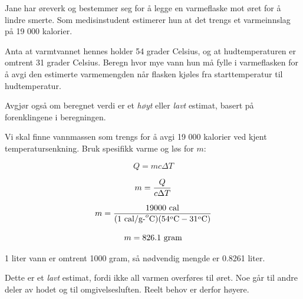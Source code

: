 

Jane har øreverk og bestemmer seg for å legge en varmeflaske mot øret for å lindre smerte. Som medisinstudent estimerer hun at det trengs et varmeinnslag på 19 000 kalorier.

\vskip 10pt

Anta at varmtvannet hennes holder 54 grader Celsius, og at hudtemperaturen er omtrent 31 grader Celsius. Beregn hvor mye vann hun må fylle i varmeflasken for å avgi den estimerte varmemengden når flasken kjøles fra starttemperatur til hudtemperatur.

\vskip 10pt

Avgjør også om beregnet verdi er et {\it høyt} eller {\it lavt} estimat, basert på forenklingene i beregningen.







Vi skal finne vannmassen som trengs for å avgi 19 000 kalorier ved kjent temperatursenkning. Bruk spesifikk varme og løs for $m$:

$$Q = mc \Delta T$$

$$m = {Q \over c \Delta T}$$

$$m = {19000 \hbox{ cal} \over (1 \hbox{ cal/g-}^o\hbox{C}) (54^o\hbox{C} - 31^o\hbox{C})}$$

$$m = 826.1 \hbox{ gram}$$

1 liter vann er omtrent 1000 gram, så nødvendig mengde er 0.8261 liter.

\vskip 10pt

Dette er et {\it lavt} estimat, fordi ikke all varmen overføres til øret. Noe går til andre deler av hodet og til omgivelsesluften. Reelt behov er derfor høyere.










